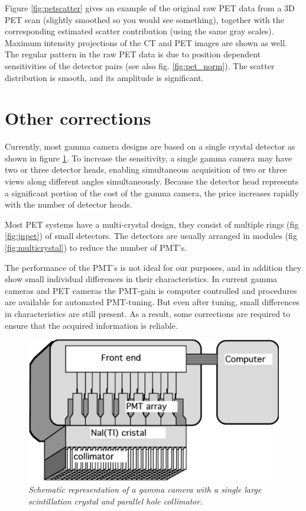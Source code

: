 Figure \ref{fig:petscatter} gives an example of the original raw PET
data from a 3D PET scan (slightly smoothed so you would see
something), together with the corresponding estimated scatter
contribution (using the same gray scales). Maximum intensity
projections of the CT and PET images are shown as well. The regular
pattern in the raw PET data is due to position dependent sensitivities
of the detector pairs (see also fig. \ref{fig:pet_norm}). The scatter
distribution is smooth, and its amplitude is significant.


\section{Other corrections \label{sec:corrections}}
Currently, most gamma camera designs are based on a single crystal detector
as shown in figure \ref{fig:gammacamera}. To increase the sensitivity, a
single gamma camera may have two or three detector heads, enabling
simultaneous acquisition of two or three views along different angles
simultaneously. Because the detector head represents a significant portion of
the cost of the gamma camera, the price increases rapidly with the number of
detector heads.

Most PET systems have a multi-crystal design, they consist of multiple rings
(fig \ref{fig:jnpet}) of small detectors. The detectors are usually arranged
in modules (fig \ref{fig:multicrystal}) to reduce the number of PMT's.

The performance of the PMT's is not ideal for our purposes, and in addition
they show small individual differences in their characteristics. In current
gamma cameras and PET cameras the PMT-gain is computer controlled and
procedures are available for automated PMT-tuning. But even after tuning,
small differences in characteristics are still present.  As a result, some
corrections are required to ensure that the acquired information is reliable.

\begin{figure}[tb]
\centering
\includegraphics[width=\figone]{figs/fig_jngamma.pdf}
\caption{\label{fig:gammacamera} \emph{Schematic representation of a gamma
camera with a single large scintillation crystal and parallel hole
collimator.}}
\end{figure}

